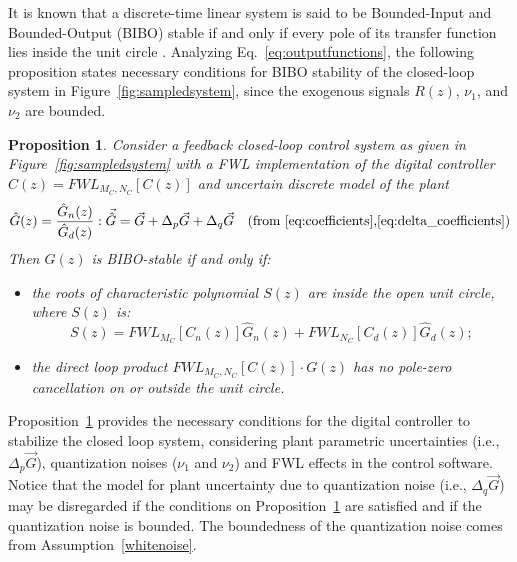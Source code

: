 \documentclass{sig-alternate-05-2015}
\newcommand{\red}[1]{{\color{red}#1}}
\newtheorem{myprop}{Proposition}
\begin{document}

It is known that a discrete-time linear system is said to be Bounded-Input and Bounded-Output
(BIBO) stable if and only if every pole of its transfer function lies inside
the unit circle \cite{Astrom08}.  Analyzing Eq.~\eqref{eq:outputfunctions}, the following
proposition states necessary conditions for BIBO stability of the closed-loop system
in Figure~\ref{fig:sampledsystem}, since the exogenous signals $R(z)$,
$\nu_{1}$, and $\nu_{2}$ are bounded.

\begin{myprop}{\cite{Bessa16,fadali}}
\label{prop:eq_int_stab} 
%
Consider a feedback closed-loop control system as given in
Figure~\ref{fig:sampledsystem} with a FWL implementation of the digital
controller $\hat{C}(z) =\mathit{FWL}_{M_C,N_C}[C(z)]$ and uncertain discrete
model of the plant
%
$$\hat{G}(z) =\frac{\hat{G}_n(z)}{\hat{G}_d(z)}: \vec{\hat{G}}=\vec{G}+\Delta_p \vec{G}+\Delta_q
\vec{G} \text{\quad(from~\ref{eq:coefficients},\ref{eq:delta_coefficients})}$$
%
Then $\hat{G}(z)$ is BIBO-stable if and only if:
%
\begin{itemize}
\item  the roots of characteristic polynomial $S(z)$ are inside the open unit circle, where $S(z)$ is:
\begin{equation}
\label{eq:internal_stab_lemma}
S(z)=\mathit{FWL}_{M_C}[C_n(z)]\hat{G}_n(z)+\mathit{FWL}_{N_C}[C_d(z)]\hat{G}_d(z);
\end{equation}
\item the direct loop product $\mathit{FWL}_{M_C,N_C}[C(z)]\cdot G(z)$ has no pole-zero cancellation on or outside the unit circle.
\end{itemize}
\end{myprop}

Proposition~\ref{prop:eq_int_stab} provides the necessary conditions for the digital controller to stabilize the closed loop system, 
considering plant parametric uncertainties (i.e., $\Delta_p \vec{G}$),
quantization noises ($\nu_{1}$ and $\nu_{2}$) and FWL effects in the control
software.  
Notice that the model for plant uncertainty due to quantization noise (i.e., $\Delta_q \vec{G}$) may be disregarded if the conditions on
Proposition~\ref{prop:eq_int_stab} are satisfied and if the quantization noise is
bounded.  The boundedness of the quantization noise comes from Assumption~\ref{whitenoise}.
\end{document}
